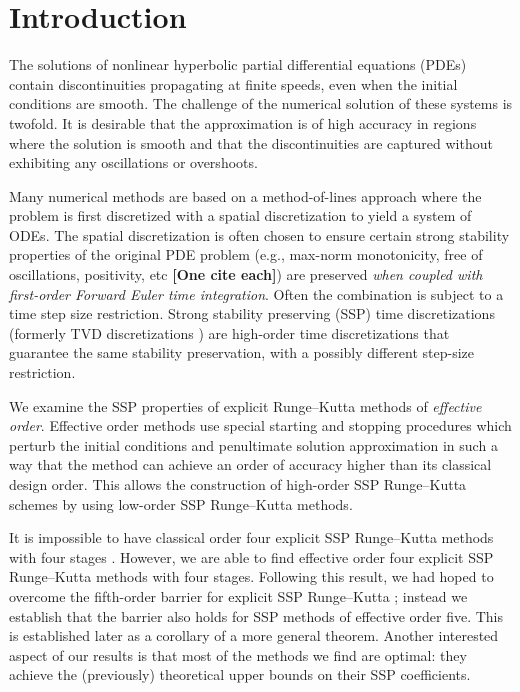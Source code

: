 \section{Introduction}\label{sec:Intro}

The solutions of nonlinear hyperbolic partial differential equations (PDEs) contain 
discontinuities propagating at finite speeds, even when the initial conditions are smooth.
The challenge of the numerical solution of these systems is twofold. 
It is desirable that the approximation is of high accuracy in regions where the solution is 
smooth and that the discontinuities are captured without exhibiting any oscillations or 
overshoots. 

Many numerical methods are based on a method-of-lines approach where the problem is first 
discretized with a spatial discretization to yield a system of ODEs.
The spatial discretization is often chosen to ensure certain strong stability properties of the original PDE problem (e.g., max-norm monotonicity, free of oscillations, positivity, etc {\bf [One cite each]}) are preserved \emph{when coupled with first-order Forward Euler time integration}.
Often the combination is subject to a time step size restriction.
Strong stability preserving (SSP) time discretizations (formerly TVD
discretizations \cite{Gottlieb1998}) are high-order time
discretizations that guarantee the same stability preservation, with a
possibly different step-size restriction.


We examine the SSP properties of explicit Runge--Kutta methods of
\emph{effective order}.
Effective order methods use special starting and stopping procedures
which perturb the initial conditions and penultimate solution
approximation in such a way that the method can achieve an order of
accuracy higher than its classical design order.
This allows the construction of high-order SSP Runge--Kutta schemes by
using low-order SSP Runge--Kutta methods.


It is impossible to have classical order four explicit SSP
Runge--Kutta methods with four stages \cite{Gottlieb1998}.  However, we
are able to find effective order four explicit SSP Runge--Kutta
methods with four stages.
Following this result, we had hoped to overcome the fifth-order
barrier for explicit SSP Runge--Kutta \cite{Ruuth2002}; instead we
establish that the barrier also holds for SSP methods of effective
order five.
This is established later as a corollary of a more general theorem.
Another interested aspect of our results is that most of the methods
we find are optimal: they achieve the (previously) theoretical upper
bounds on their SSP coefficients.

